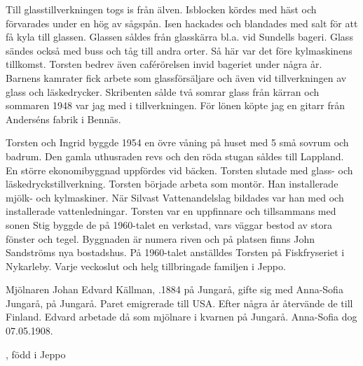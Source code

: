 Till glasstillverkningen togs is från älven. Isblocken kördes med häst och förvarades under en hög av sågspån. Isen hackades och blandades 	med salt för att få kyla till glassen. Glassen såldes från glasskärra bl.a. vid Sundells bageri. Glass sändes också med buss och tåg till andra orter. Så här var det före kylmaskinens tillkomst. Torsten bedrev även caférörelsen invid bageriet under några år. Barnens kamrater fick arbete som glassförsäljare och även vid tillverkningen av glass och läskedrycker. Skribenten sålde två somrar glass från kärran och sommaren 1948 var jag med i tillverkningen. För lönen köpte jag en gitarr från Anderséns fabrik i Bennäs.


Torsten och Ingrid byggde 1954 en övre våning på huset med 5 små sovrum och badrum. Den gamla uthusraden revs och den röda stugan såldes till Lappland. En större ekonomibyggnad uppfördes vid bäcken. Torsten slutade med glass- och läskedryckstillverkning. Torsten började arbeta som montör. Han installerade mjölk- och kylmaskiner. När Silvast	Vattenandelslag bildades var han med och installerade vattenledningar. Torsten var en uppfinnare och tillsammans med sonen Stig byggde de på 1960-talet en verkstad, vars väggar bestod av stora fönster och tegel. 	Byggnaden är numera riven och på platsen finns John Sandströms nya 	bostadshus. På 1960-talet anställdes Torsten på Fiskfryseriet i Nykarleby. Varje veckoslut och helg tillbringade familjen i Jeppo.


%
Mjölnaren Johan Edvard Källman, .1884 på Jungarå, gifte sig med Anna-Sofia Jungarå,  på Jungarå. Paret emigrerade till USA. Efter några år återvände de till Finland. Edvard arbetade då som mjölnare i kvarnen på Jungarå. Anna-Sofia dog 07.05.1908.
\begin{jhchildren}
  \item {}
  \item {}
  \item {}, född i Jeppo
\end{jhchildren}

